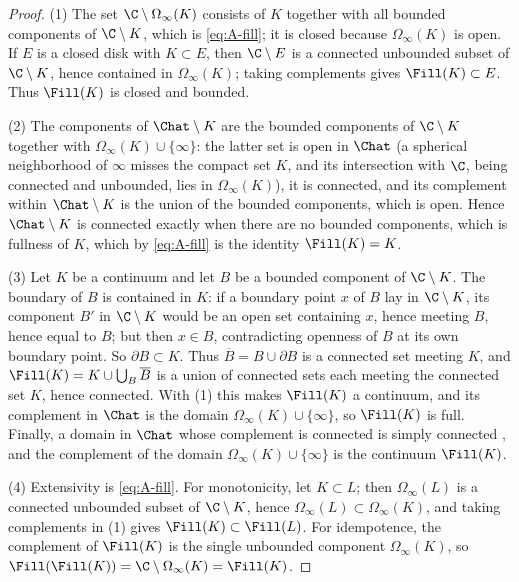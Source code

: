 \begin{proof}
(1) The set $\C\setminus\Omega_\infty(K)$ consists of $K$ together with
all bounded components of $\C\setminus K$, which is \eqref{eq:A-fill}; it
is closed because $\Omega_\infty(K)$ is open.  If $E$ is a closed disk with
$K\subset E$, then $\C\setminus E$ is a connected unbounded subset of
$\C\setminus K$, hence contained in $\Omega_\infty(K)$; taking complements
gives $\Fill(K)\subset E$.  Thus $\Fill(K)$ is closed and
bounded.

(2) The components of $\Chat\setminus K$ are the bounded components of
$\C\setminus K$ together with $\Omega_\infty(K)\cup\{\infty\}$: the latter
set is open in $\Chat$ (a spherical neighborhood of $\infty$ misses the
compact set $K$, and its intersection with $\C$, being connected and
unbounded, lies in $\Omega_\infty(K)$), it is connected, and its
complement within $\Chat\setminus K$ is the union of the bounded
components, which is open.
Hence $\Chat\setminus K$ is connected exactly when there are no bounded
components, which is fullness of $K$, which by \eqref{eq:A-fill} is the
identity $\Fill(K)=K$.

(3) Let $K$ be a continuum and let $B$ be a bounded component of
$\C\setminus K$.  The boundary of $B$ is contained in $K$: if a boundary
point $x$ of $B$ lay in $\C\setminus K$, its component $B'$ in
$\C\setminus K$ would be an open set containing $x$, hence meeting $B$,
hence equal to $B$; but then $x\in B$, contradicting openness of $B$ at
its own boundary point.  So $\partial B\subset K$.  Thus $\overline{B}=B\cup\partial B$ is a
connected set meeting $K$, and
$\Fill(K)=K\cup\bigcup_B\overline{B}$ is a union of connected sets each
meeting the connected set $K$, hence connected.  With (1) this makes
$\Fill(K)$ a continuum, and its complement in $\Chat$ is the domain
$\Omega_\infty(K)\cup\{\infty\}$, so $\Fill(K)$ is full.  Finally, a
domain in $\Chat$ whose complement is connected is simply connected
\cite{New51,Why42}, and the complement of the domain
$\Omega_\infty(K)\cup\{\infty\}$ is the continuum $\Fill(K)$.

(4) Extensivity is \eqref{eq:A-fill}.  For monotonicity, let
$K\subset L$; then $\Omega_\infty(L)$ is a connected unbounded subset of
$\C\setminus K$, hence $\Omega_\infty(L)\subset\Omega_\infty(K)$, and
taking complements in (1) gives $\Fill(K)\subset\Fill(L)$.  For
idempotence, the complement of $\Fill(K)$ is the single unbounded
component $\Omega_\infty(K)$, so $\Fill(\Fill(K))=\C\setminus
\Omega_\infty(K)=\Fill(K)$.
\end{proof}

